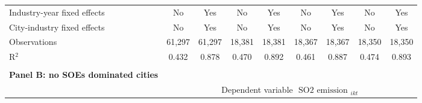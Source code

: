 \documentclass[12pt]{article}
\begin{document}
\begin{table}[!htb]
\begin{adjustbox}{width=\textwidth, totalheight=\baselineskip,keepaspectratio}
\begin{tabular}{@{\extracolsep{5pt}}lcccccccc}
Industry-year fixed effects & No & Yes & No & Yes & No & Yes & No & Yes \\ 
City-industry fixed effects & No & Yes & No & Yes & No & Yes & No & Yes \\ 
Observations & 61,297 & 61,297 & 18,381 & 18,381 & 18,367 & 18,367 & 18,350 & 18,350 \\ 
R$^{2}$ & 0.432 & 0.878 & 0.470 & 0.892 & 0.461 & 0.887 & 0.474 & 0.893 \\ 
        \bottomrule
        \\ %
        \multicolumn{1}{l}{\textbf{Panel B: no SOEs dominated cities}} \\
        \toprule
        & \multicolumn{8}{c}{Dependent variable $\text { SO2 emission }_{i k t}$} \\ 
        \cline{2-9}
            

\end{tabular}
\end{adjustbox}
\end{table}
\end{document}

